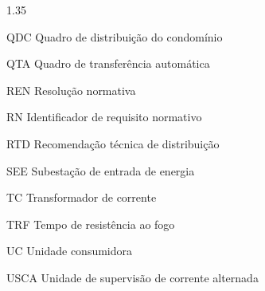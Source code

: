 \begin{Spacing}{1.35}
\begin{list}{}
  \item[QDC] Quadro de distribuição do condomínio
  \item[QTA] Quadro de transferência automática
  \item[REN] Resolução normativa
  \item[RN] Identificador de requisito normativo
  \item[RTD] Recomendação técnica de distribuição
  \item[SEE] Subestação de entrada de energia
  \item[TC] Transformador de corrente
  \item[TRF] Tempo de resistência ao fogo
  \item[UC] Unidade consumidora
  \item[USCA] Unidade de supervisão de corrente alternada
\end{list}
\end{Spacing}
\cleardoublepage
